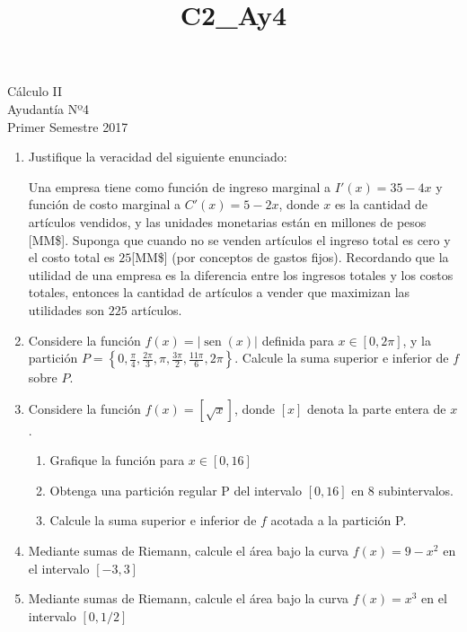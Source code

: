 \documentclass[a4paper,10pt]{article}
\title{C2_Ay4}
\def\sin{\operatorname{sen}}
\begin{document}
\begin{center}
Cálculo II\\
Ayudantía Nº4\\
Primer Semestre 2017
\end{center}



\begin{enumerate}
\item Justifique la veracidad del siguiente enunciado:

Una empresa tiene como función de ingreso marginal a $I'(x)=35-4x$ y función de costo marginal a $C'(x) = 5-2x$, donde $x$ es la cantidad de artículos vendidos, y las unidades monetarias están en millones de pesos [MM\$]. Suponga que cuando no se venden artículos el ingreso total es cero y el costo total es $25$[MM\$] (por conceptos de gastos fijos). Recordando que la utilidad de una empresa es la diferencia entre los ingresos totales y los costos totales, entonces la cantidad de artículos a vender que maximizan las utilidades son $225$ artículos.

\item Considere la función $f(x) = |\sin(x)|$ definida para $x \in [0,2\pi]$, y la partición $\displaystyle P = \left\{ 0, \frac{\pi}{4} , \frac{2\pi}{3} , \pi , \frac{3\pi}{2} , \frac{11\pi}{6} , 2\pi \right\}$. Calcule la suma superior e inferior de $f$ sobre $P$.


\item Considere la función $f(x)= [\sqrt{x}]$, donde $[x]$ denota la parte entera de $x$.
\begin{enumerate}[label=\emph{\alph*)}]
\item Grafique la función para $x \in [0,16]$
\item Obtenga una partición regular P del intervalo $[0,16]$ en 8 subintervalos.
\item  Calcule la suma superior e inferior de $f$ acotada a la partición P.
\end{enumerate}

\item Mediante sumas de Riemann, calcule el área bajo la curva $f(x) = 9-x^2$ en el intervalo $[-3,3]$

\item Mediante sumas de Riemann, calcule el área bajo la curva $f(x) = x^3$ en el intervalo $[0,1/2]$

\end{enumerate}




\vspace{10mm}
\end{document}
